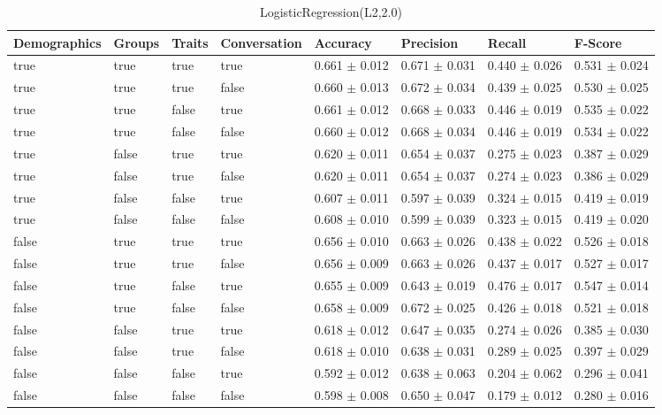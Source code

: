 \clearpage
\begin{table}[h]
	\centering
	\begin{tabular}{|l|l|l|l|l|l|l|l|} %
	\hline
	Demographics & Groups & Traits & Conversation & Accuracy & Precision & Recall & F-Score \\ \hline
	true & true & true & true & 0.661	\( \pm \) 0.012	& 0.671	\( \pm \) 0.031	& 0.440	\( \pm \) 0.026	& 0.531	\( \pm \) 0.024	\\ \hline
	true & true & true & false & 0.660	\( \pm \) 0.013	& 0.672	\( \pm \) 0.034	& 0.439	\( \pm \) 0.025	& 0.530	\( \pm \) 0.025	\\ \hline
	true & true & false & true & 0.661	\( \pm \) 0.012	& 0.668	\( \pm \) 0.033	& 0.446	\( \pm \) 0.019	& 0.535	\( \pm \) 0.022	\\ \hline
	true & true & false & false & 0.660	\( \pm \) 0.012	& 0.668	\( \pm \) 0.034	& 0.446	\( \pm \) 0.019	& 0.534	\( \pm \) 0.022	\\ \hline
	true & false & true & true & 0.620	\( \pm \) 0.011	& 0.654	\( \pm \) 0.037	& 0.275	\( \pm \) 0.023	& 0.387	\( \pm \) 0.029	\\ \hline
	true & false & true & false & 0.620	\( \pm \) 0.011	& 0.654	\( \pm \) 0.037	& 0.274	\( \pm \) 0.023	& 0.386	\( \pm \) 0.029	\\ \hline
	true & false & false & true & 0.607	\( \pm \) 0.011	& 0.597	\( \pm \) 0.039	& 0.324	\( \pm \) 0.015	& 0.419	\( \pm \) 0.019	\\ \hline
	true & false & false & false & 0.608	\( \pm \) 0.010	& 0.599	\( \pm \) 0.039	& 0.323	\( \pm \) 0.015	& 0.419	\( \pm \) 0.020	\\ \hline
	false & true & true & true & 0.656	\( \pm \) 0.010	& 0.663	\( \pm \) 0.026	& 0.438	\( \pm \) 0.022	& 0.526	\( \pm \) 0.018	\\ \hline
	false & true & true & false & 0.656	\( \pm \) 0.009	& 0.663	\( \pm \) 0.026	& 0.437	\( \pm \) 0.017	& 0.527	\( \pm \) 0.017	\\ \hline
	false & true & false & true & 0.655	\( \pm \) 0.009	& 0.643	\( \pm \) 0.019	& 0.476	\( \pm \) 0.017	& 0.547	\( \pm \) 0.014	\\ \hline
	false & true & false & false & 0.658	\( \pm \) 0.009	& 0.672	\( \pm \) 0.025	& 0.426	\( \pm \) 0.018	& 0.521	\( \pm \) 0.018	\\ \hline
	false & false & true & true & 0.618	\( \pm \) 0.012	& 0.647	\( \pm \) 0.035	& 0.274	\( \pm \) 0.026	& 0.385	\( \pm \) 0.030	\\ \hline
	false & false & true & false & 0.618	\( \pm \) 0.010	& 0.638	\( \pm \) 0.031	& 0.289	\( \pm \) 0.025	& 0.397	\( \pm \) 0.029	\\ \hline
	false & false & false & true & 0.592	\( \pm \) 0.012	& 0.638	\( \pm \) 0.063	& 0.204	\( \pm \) 0.062	& 0.296	\( \pm \) 0.041	\\ \hline
	false & false & false & false & 0.598	\( \pm \) 0.008	& 0.650	\( \pm \) 0.047	& 0.179	\( \pm \) 0.012	& 0.280	\( \pm \) 0.016	\\ \hline
	\end{tabular}
	\caption{LogisticRegression(L2,2.0)}
	\label{tab:revpol}
\end{table}
